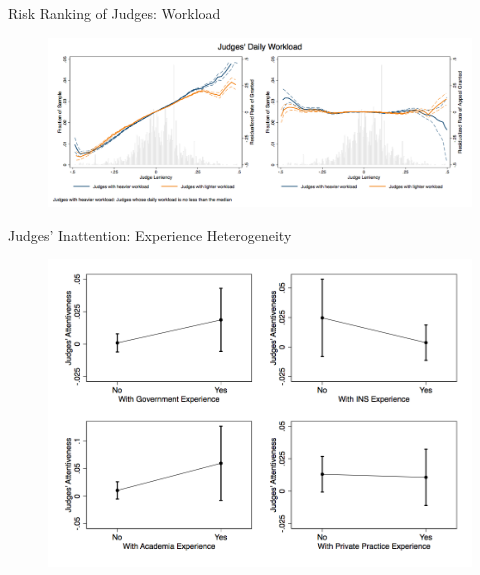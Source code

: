 \begin{frame}{Risk Ranking of Judges: Workload}
    \begin{figure}
        \centering
        \includegraphics[height = 0.7 \textheight]{images/comp_judge_morecase_perday.png}
    \end{figure}
\end{frame}

\begin{frame}{Judges' Inattention: Experience Heterogeneity}
    \begin{figure}
        \centering
        \includegraphics[height = 0.8 \textheight]{images/judge_expdum_full.png}
    \end{figure}
\end{frame}

